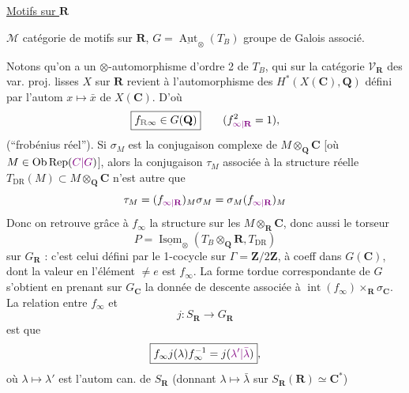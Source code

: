 
\uline{Motifs sur $\mathbf R$}

$\mathcal M$ \inserted{$\otimes$} catégorie de motifs sur $\mathbf R$, $G=\underline{\operatorname{Aut}}_\otimes(T_B)$ groupe de Galois associé.

Notons qu'on a un $\otimes$-automorphisme d'ordre 2 de $T_B$, qui sur la catégorie $\mathcal V_{\mathbf R}$ des var. proj. lisses $X$ sur $\mathbf R$ revient à l'automorphisme des $H^*(X(\mathbf C),\mathbf Q)$ défini par l'autom $x\mapsto\bar x$ de $X(\mathbf C)$. D'où
\[
\boxed{f_{\deleted{\mathbf R}\infty}\in G(\mathbf Q)}
\qquad(f_{\unsure{\infty|\mathbf R}}^2=1),
\]
(``frobénius réel'').  Si $\sigma_M$ est la conjugaison complexe de $M\otimes_{\mathbf Q}\mathbf C$ [où $M\in\operatorname{Ob}\operatorname{Rep}(\unsure{C|G})$], alors la conjugaison $\tau_M$ associée à la structure réelle $T_{\mathrm{DR}}(M)\subset M\otimes_{\mathbf Q}\mathbf C$ n'est autre que
\[
\tau_M=(f_{\unsure{\infty|\mathbf R}})_M\sigma_M
=\sigma_M(f_{\unsure{\infty|\mathbf R}})_M
\]
Donc on retrouve grâce à $f_\infty$ la structure  sur les $M\otimes_{\mathbf R}\mathbf C$, donc aussi le torseur
\[
P=\underline{\operatorname{Isom}}_\otimes(T_B\otimes_{\mathbf Q}\mathbf R,T_{\mathrm{DR}})
\]
sur $G_{\mathbf R}$ : c'est celui défini par le 1-cocycle   sur $\Gamma=\mathbf Z/2\mathbf Z$, à coeff dans $G(\mathbf C)$, dont la valeur en l'élément $\ne e$ est $f_\infty$. La forme tordue correspondante de $G$ s'obtient en prenant sur $G_{\mathbf C}$ la donnée de descente associée à  $\operatorname{int}(f_\infty)\times_{\mathbf R}\sigma_{\mathbf C}$.  La relation entre $f_\infty$ et
\[
j:S_{\mathbf R}\longrightarrow G_{\mathbf R}
\]
est que
\[
\boxed{f_\infty j(\lambda)f_\infty^{-1}=j(\unsure{\lambda'|\bar\lambda})},
\]
où $\lambda\mapsto\lambda'$ est l'autom can. de $S_{\mathbf R}$ (donnant $\lambda\mapsto\bar\lambda$ sur $S_{\mathbf R}(\mathbf R)\simeq\mathbf C^*$)

